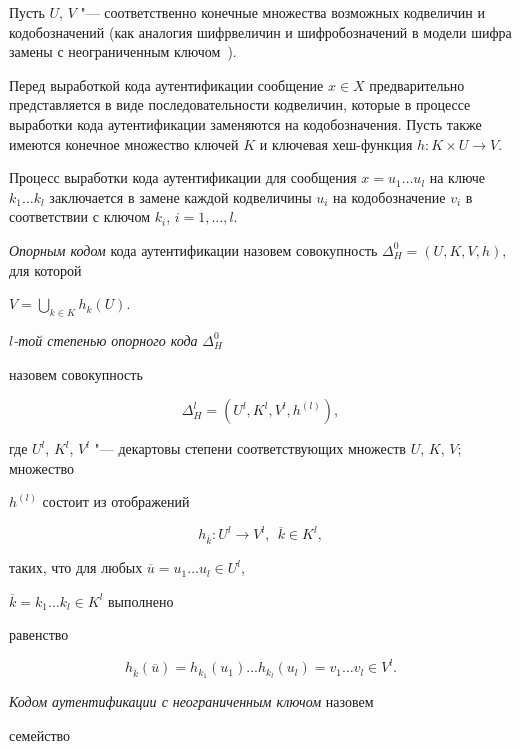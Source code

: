 Пусть $U$, $V$ "--- соответственно конечные множества возможных кодвеличин и кодобозначений (как аналогия шифрвеличин и шифробозначений в модели шифра замены с неограниченным ключом~\cite{ratseev:bib:Zubov}).

Перед выработкой кода аутентификации сообщение $x \in X$ предварительно представляется в виде последовательности кодвеличин, которые в процессе выработки кода аутентификации заменяются на кодобозначения. Пусть также имеются конечное множество ключей $K$ и ключевая хеш-функция $h: K\times U \rightarrow V.$

Процесс выработки кода аутентификации для сообщения $x=u_1\dots u_l$ на ключе $k_1\dots k_l$ заключается в замене каждой кодвеличины $u_i$ на кодобозначение $v_i$ в соответствии с ключом $k_i$, $i=1,\dots ,l$. 

{\it Опорным кодом} кода аутентификации назовем совокупность $\Delta_H^0 = (U, K, V, h),$ для которой 

$V = \bigcup_{k\in K}h_k(U).$



{\it $l$-той степенью опорного кода} $\Delta_H^0$

назовем совокупность

$$

\Delta_H^l = (U^l, K^l, V^l, h^{(l)}),

$$

где $U^l$, $K^l$, $V^l$ "--- декартовы степени соответствующих множеств $U$, $K$, $V$; множество

$h^{(l)}$ состоит из отображений

$$

h_{\overline{k}}: U^l \rightarrow V^l, ~~\overline{k}

\in K^l,

$$

таких, что для любых $\overline{u} = u_1\dots u_l \in U^l$,

$\overline{k} = k_1\dots k_l \in K^l$ выполнено

равенство

$$

h_{\overline{k}}(\overline{u})=

h_{k_1}(u_1)...h_{k_l}(u_l)=v_1\dots v_l \in V^l.

$$



{\it Кодом аутентификации с неограниченным ключом} назовем

семейство

$$

